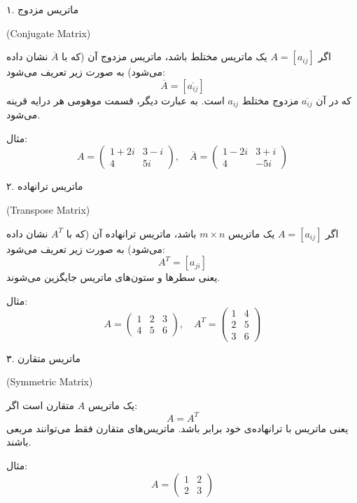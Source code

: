 	\begin{definition}
		
	 ۱. ماتریس مزدوج
	 \begin{latin}
	 	 (Conjugate Matrix)
	 \end{latin}
	اگر \( A = [a_{ij}] \) یک ماتریس مختلط باشد، ماتریس مزدوج آن (که با \( \overline{A} \) نشان داده می‌شود) به صورت زیر تعریف می‌شود:
	\[
	\overline{A} = [\overline{a_{ij}}]
	\]
	که در آن \( \overline{a_{ij}} \) مزدوج مختلط \( a_{ij} \) است. به عبارت دیگر، قسمت موهومی هر درایه قرینه می‌شود.
	
	 مثال:
	\[
	A = \begin{pmatrix}
		1 + 2i & 3 - i \\
		4 & 5i
	\end{pmatrix}, \quad
	\overline{A} = \begin{pmatrix}
		1 - 2i & 3 + i \\
		4 & -5i
	\end{pmatrix}
	\]
	
	\end{definition}
	
	\begin{definition}
		 ۲. ماتریس ترانهاده\begin{latin}
		 	 (Transpose Matrix)
		 \end{latin}
	اگر \( A = [a_{ij}] \) یک ماتریس \( m \times n \) باشد، ماتریس ترانهاده آن (که با \( A^T \) نشان داده می‌شود) به صورت زیر تعریف می‌شود:
	\[
	A^T = [a_{ji}]
	\]
	یعنی سطرها و ستون‌های ماتریس جایگزین می‌شوند.
	
	 مثال:
	\[
	A = \begin{pmatrix}
		1 & 2 & 3 \\
		4 & 5 & 6
	\end{pmatrix}, \quad
	A^T = \begin{pmatrix}
		1 & 4 \\
		2 & 5 \\
		3 & 6
	\end{pmatrix}
	\]
	

	\end{definition}
	\begin{definition}
		
	 ۳. ماتریس متقارن \begin{latin}
	 	(Symmetric Matrix)
	 \end{latin}
	یک ماتریس \( A \) متقارن است اگر:
	\[
	A = A^T
	\]
	یعنی ماتریس با ترانهاده‌ی خود برابر باشد. ماتریس‌های متقارن فقط می‌توانند مربعی باشند.
	
	 مثال:
	\[
	A = \begin{pmatrix}
		1 & 2 \\
		2 & 3
	\end{pmatrix}
	\]
	
	\end{definition}
	
